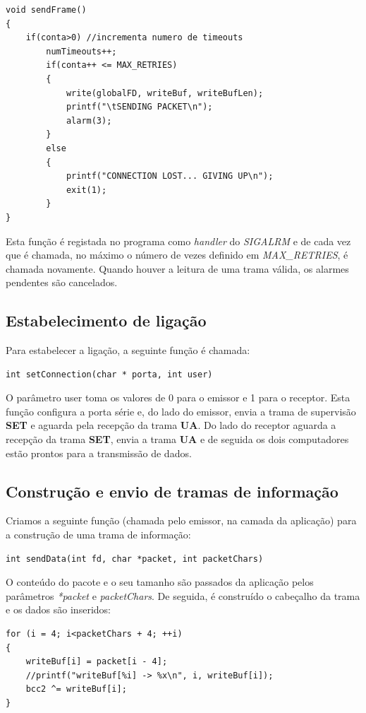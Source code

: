 \documentclass[a4paper,11pt]{article}
\begin{document}
\begin{lstlisting}
void sendFrame()
{
    if(conta>0) //incrementa numero de timeouts
        numTimeouts++;
        if(conta++ <= MAX_RETRIES)
        {
            write(globalFD, writeBuf, writeBufLen);
            printf("\tSENDING PACKET\n");
            alarm(3);
        }
        else
        {
            printf("CONNECTION LOST... GIVING UP\n");
            exit(1);
        }
}
\end{lstlisting}

Esta função é registada no programa como \textit{handler} do \textit{SIGALRM} e de cada vez que é chamada, no máximo o número de vezes definido em \textit{MAX\_RETRIES}, é chamada novamente.
Quando houver a leitura de uma trama válida, os alarmes pendentes são cancelados.

\subsection{Estabelecimento de ligação}

Para estabelecer a ligação, a seguinte função é chamada:\\
		
\begin{lstlisting}
int setConnection(char * porta, int user)
\end{lstlisting}

O parâmetro user toma os valores de 0 para o emissor e 1 para o receptor.
Esta função configura a porta série e, do lado do emissor, envia a trama de supervisão \textbf{SET} e aguarda pela recepção da trama \textbf{UA}.
Do lado do receptor aguarda a recepção da trama \textbf{SET}, envia a trama \textbf{UA} e de seguida os dois computadores estão prontos para a transmissão de dados.

\subsection{Construção e envio de tramas de informação}

Criamos a seguinte função (chamada pelo emissor, na camada da aplicação) para a construção de uma trama de informação:

\begin{lstlisting}
int sendData(int fd, char *packet, int packetChars)
\end{lstlisting}

O conteúdo do pacote e o seu tamanho são passados da aplicação pelos parâmetros \textit{*packet} e \textit{packetChars}.
De seguida, é construído o cabeçalho da trama e os dados são inseridos:
\begin{lstlisting}
for (i = 4; i<packetChars + 4; ++i)
{
    writeBuf[i] = packet[i - 4];
    //printf("writeBuf[%i] -> %x\n", i, writeBuf[i]);
    bcc2 ^= writeBuf[i];
}
\end{lstlisting}
\end{document}
